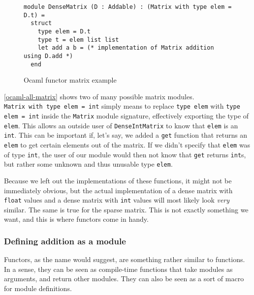\begin{figure*}
\begin{verbatim}
module DenseMatrix (D : Addable) : (Matrix with type elem = D.t) =
  struct
    type elem = D.t
    type t = elem list list
    let add a b = (* implementation of Matrix addition using D.add *)
  end
\end{verbatim}
\caption{Ocaml functor matrix example}
\label{ocaml-matrix-functor}
\end{figure*}

\autoref{ocaml-all-matrix} shows two of many possible matrix modules. \\ \verb|Matrix with type elem = int| simply means to replace \verb|type elem| with \verb|type elem = int| inside the \verb|Matrix| module signature, effectively exporting the type of \verb|elem|. This allows an outside user of \verb|DenseIntMatrix| to know that \verb|elem| is an \verb|int|. This can be important if, let's say, we added a \verb|get| function that returns an \verb|elem| to get certain elements out of the matrix. If we didn't specify that \verb|elem| was of type \verb|int|, the user of our module would then not know that \verb|get| returns \verb|int|s, but rather some unknown and thus unusable type \verb|elem|.

Because we left out the implementations of these functions, it might not be immediately obvious, but the actual implementation of a dense matrix with \verb|float| values and a dense matrix with \verb|int| values will most likely look \textit{very} similar. The same is true for the sparse matrix. This is not exactly something we want, and this is where functors come in handy.

\subsubsection{Defining addition as a module}

Functors, as the name would suggest, are something rather similar to functions. In a sense, they can be seen as compile-time functions that take modules as arguments, and return other modules. They can also be seen as a sort of macro for module definitions.

